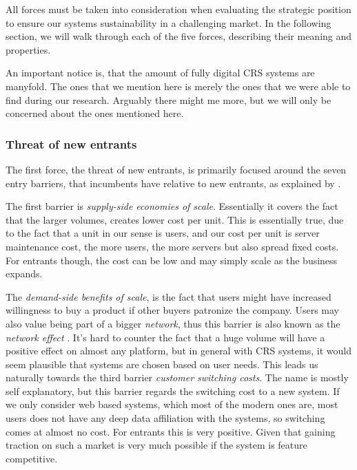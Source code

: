 All forces must be taken into consideration when evaluating the strategic position to ensure our systems sustainability  in a challenging market. 
In the following section, we will walk through each of the five forces, describing their meaning and properties.

An important notice is, that the amount of fully digital CRS systems are manyfold. The ones that we mention here is merely the ones that we were able to find during our research. Arguably there might me more, but we will only be concerned about the ones mentioned here. 


\subsubsection*{Threat of new entrants}\label{sec:threat-of-new-entrants}
The first force, the threat of new entrants, is primarily focused around the seven entry barriers, that incumbents have relative to new entrants, as explained by .

The first barrier is \emph{supply-side economies of scale}. Essentially it covers the fact that the larger volumes, creates lower cost per unit. This is essentially true, due to the fact that a unit in our sense is users, and our cost per unit is server maintenance cost, the more users, the more servers but also spread fixed costs. For entrants though, the cost can be low and may simply scale as the business expands.

The \emph{demand-side benefits of scale}, is the fact that users might have increased willingness to buy a product if other buyers patronize the company. Users may also value being part of a bigger \emph{network}, thus this barrier is also known as the \emph{network effect} \cite[p.~81]{porter2008five}. It's hard to counter the fact that a huge volume will have a positive effect on almost any platform, but in general with CRS systems, it would seem plausible that systems are chosen based on user needs. This leads us naturally towards the third barrier \emph{customer switching costs}. The name is mostly self explanatory, but this barrier regards the switching cost to a new system. If we only consider web based systems, which most of the modern ones are, most users does not have any deep data affiliation with the systems, so switching comes at almost no cost. For entrants this is very positive. Given that gaining traction on such a market is very much possible if the system is feature competitive.

